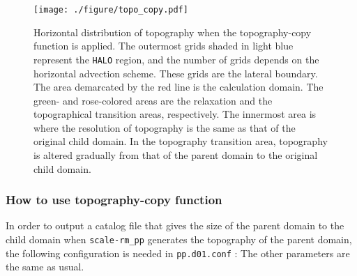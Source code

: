\begin{figure}[tbh]
\begin{center}
  \texttt{[image: ./figure/topo\_copy.pdf]}\\
  \caption{Horizontal distribution of topography when the topography-copy function is applied.
    The outermost grids shaded in light blue represent the \texttt{HALO} region, and the number of grids depends on
    the horizontal advection scheme.
    These grids are the lateral boundary. The area demarcated by the red line is the calculation domain.
    The green- and rose-colored areas are the relaxation and the topographical transition areas, respectively.
    The innermost area is where the resolution of topography is the same as that of the original child domain.
    In the topography transition area, topography is altered gradually from that of
    the parent domain to the original child domain.
}
  \label{fig_topocopy}
\end{center}
\end{figure}



\subsubsection{How to use topography-copy function}

In order to output a catalog file that gives the size of the parent domain to the child domain when \verb|scale-rm_pp| generates the topography of the parent domain, the following configuration is needed in \verb|pp.d01.conf| :
The other parameters are the same as usual.

